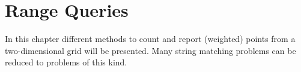 \chapter{Range Queries}
\label{chp:rangeQueries}

In this chapter different methods to count and report (weighted) points from a two-dimensional grid will be presented. Many string matching problems can be reduced to problems of this kind.



